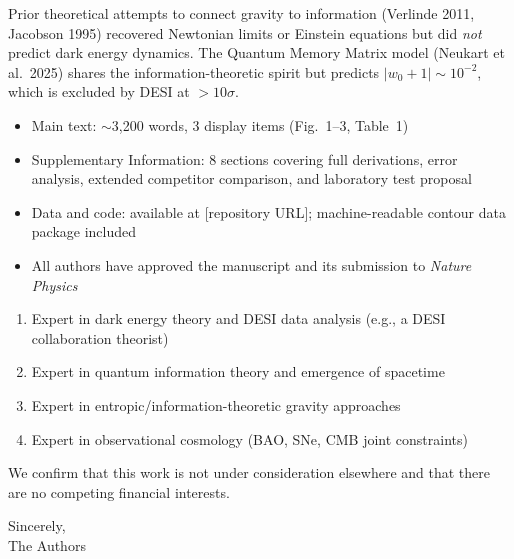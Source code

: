 \documentclass[12pt]{article}
\begin{document}
Prior theoretical attempts to connect gravity to information (Verlinde 2011, Jacobson 1995) recovered Newtonian limits or Einstein equations but did {\it not} predict dark energy dynamics. The Quantum Memory Matrix model (Neukart et al.\ 2025) shares the information-theoretic spirit but predicts $|w_0+1|\sim10^{-2}$, which is excluded by DESI at $>10\sigma$.

\vspace{10pt}


\begin{itemize}
\item Main text: $\sim$3,200 words, 3 display items (Fig.~1--3, Table~1)
\item Supplementary Information: 8 sections covering full derivations, error analysis, extended competitor comparison, and laboratory test proposal
\item Data and code: available at [repository URL]; machine-readable contour data package included
\item All authors have approved the manuscript and its submission to {\it Nature Physics}
\end{itemize}

\vspace{10pt}


\begin{enumerate}
\item Expert in dark energy theory and DESI data analysis (e.g., a DESI collaboration theorist)
\item Expert in quantum information theory and emergence of spacetime
\item Expert in entropic/information-theoretic gravity approaches
\item Expert in observational cosmology (BAO, SNe, CMB joint constraints)
\end{enumerate}

\vspace{10pt}

\noindent We confirm that this work is not under consideration elsewhere and that there are no competing financial interests.

\vspace{20pt}

\noindent Sincerely,\\
\vspace{10pt}
\noindent The Authors
\end{document}
